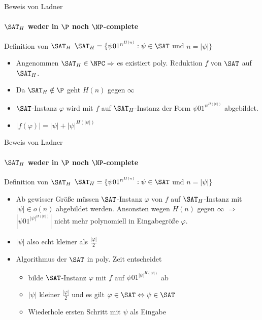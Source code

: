 \begin{frame}{Beweis von Ladner}
		\framesubtitle{${\SAT}_H$ weder in $\P$ noch $\NP$-complete}
	
		\begin{KITinfoblock}{Definition von ${\SAT}_H$}	
			${\SAT}_H = \lbrace \psi 01^{n^{H(n)}} : \psi \in \SAT$ und $ n = |\psi| \rbrace$
		\end{KITinfoblock}
		
		
		\bigskip
		
		\bigskip
		\pause
		\begin{itemize}[<+->]
			\item Angenommen ${\SAT}_H \in \NPC \Rightarrow $ es existiert poly. Reduktion $f$ von $\SAT$ auf ${\SAT}_H$.
			\item Da ${\SAT}_H \notin \P $ geht $H(n)$ gegen $\infty$ 
			\item $\SAT$-Instanz $\varphi$ wird mit $f$ auf ${\SAT}_H$-Instanz der Form $\psi01^{{\psi}^{H(|\psi|)}}$ abgebildet.
			\item $|f(\varphi)|=|\psi| + {|\psi|}^{H(|\psi|)}$
		\end{itemize}
\end{frame}
\begin{frame}{Beweis von Ladner}
	\framesubtitle{${\SAT}_H$ weder in $\P$ noch $\NP$-complete}
	
	\begin{KITinfoblock}{Definition von ${\SAT}_H$}	
		${\SAT}_H = \lbrace \psi 01^{n^{H(n)}} : \psi \in \SAT$ und $ n = |\psi| \rbrace$
	\end{KITinfoblock}
		\begin{itemize}[<+->]
	
		\item Ab gewisser Größe müssen $\SAT$-Instanz $\varphi$ von $f$ auf ${\SAT}_H$-Instanz mit $|\psi| \in o(n)$  abgebildet werden.
		 \newline 
		Ansonsten wegen $H(n)$ gegen $\infty$ \newline $ \Rightarrow $$|\psi01^{|\psi|^{H(|\psi|)}} |$  nicht mehr polynomiell in Eingabegröße $\varphi$.
		\item $|\psi|$ also echt kleiner als $\frac{|\varphi|}{2}$
		\item Algorithmus der $\SAT$ in poly. Zeit entscheidet 
			\begin{itemize}
				\item bilde $\SAT$-Instanz $\varphi$ mit $f$ auf $\psi01^{|\psi|^{H(|\psi|)}}$ ab
				\item $|\psi|$ kleiner $\frac{|\varphi|}{2}$ und es gilt $\varphi \in \SAT \Leftrightarrow \psi \in \SAT$ 
				\item Wiederhole ersten Schritt mit $\psi$ als Eingabe
			\end{itemize}
		\end{itemize}
\end{frame}